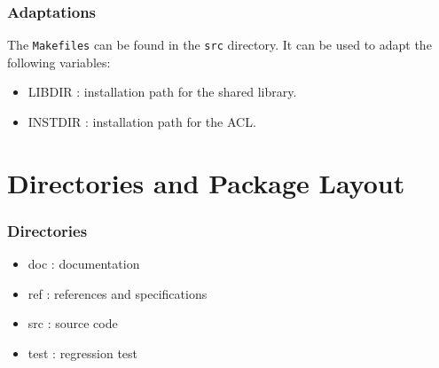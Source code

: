 \subsubsection{Adaptations}
The \texttt{Makefiles} can be found in the \texttt{src} directory. It can be used to
adapt the following variables:
\begin{itemize}
\item LIBDIR : installation path for the shared library.
\item INSTDIR : installation path for the ACL.
\end{itemize}


\section{Directories and Package Layout}
\subsubsection{Directories}
\begin{itemize}
\item doc : documentation
\item ref : references and specifications
\item src : source code
\item test : regression test
\end{itemize}


